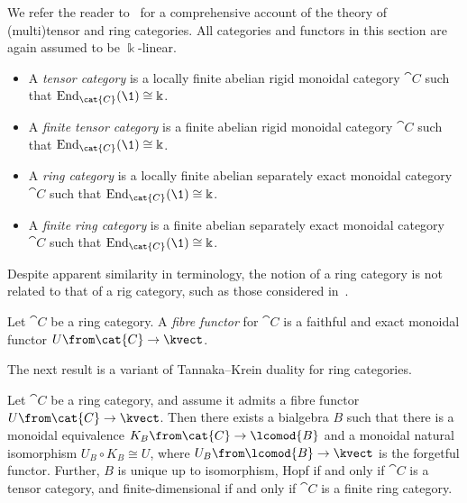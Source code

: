 We refer the reader to~\cite[Chapter~4]{Etingof2015} for a comprehensive account of the theory of (multi)tensor and ring categories.
All categories and functors in this section are again assumed to be \(\Bbbk\)\hyp{}linear.

\begin{definition}\hfill
  \begin{itemize}
    \item A \emph{tensor category} is a locally finite abelian rigid monoidal category \(\cat{C}\) such that \(\mathrm{End}_{\cat{C}}(\1) \cong \Bbbk\).
    \item A \emph{finite tensor category} is a finite abelian rigid monoidal category \(\cat{C}\) such that \(\mathrm{End}_{\cat{C}}(\1) \cong \Bbbk\).
    \item A \emph{ring category} is a locally finite abelian separately exact monoidal category \(\cat{C}\) such that \(\mathrm{End}_{\cat{C}}(\1) \cong \Bbbk\).
    \item A \emph{finite ring category} is a finite abelian separately exact monoidal category \(\cat{C}\) such that \(\mathrm{End}_{\cat{C}}(\1) \cong \Bbbk\).
  \end{itemize}
\end{definition}

Despite apparent similarity in terminology,
the notion of a ring category is not related to that of a rig category,
such as those considered in~\cite{johnson-yau2021:TwoDimensionalCategories}.

\begin{definition}
  Let \(\cat{C}\) be a ring category.
  A \emph{fibre functor} for \(\cat{C}\) is a faithful and exact monoidal functor \(U\from \cat{C} \to \kvect\).
\end{definition}

The next result is a variant of Tannaka--Krein duality for ring categories.

\begin{theorem}
  Let \(\cat{C}\) be a ring category, and assume it admits a fibre functor \(U\from \cat{C} \to  \kvect\).
  Then there exists a bialgebra \(B\) such that there is a monoidal equivalence \(K_B\from \cat{C} \to \lcomod{B}\)
  and a monoidal natural isomorphism \(U_{B} \circ K_{B} \cong U\), where \(U_{B}\from \lcomod{B} \to \kvect\) is the forgetful functor.
  Further, \(B\) is unique up to isomorphism, Hopf if and only if \(\cat{C}\) is a tensor category, and finite\hyp{}dimensional if and only if \(\cat{C}\) is a finite ring category.
\end{theorem}


